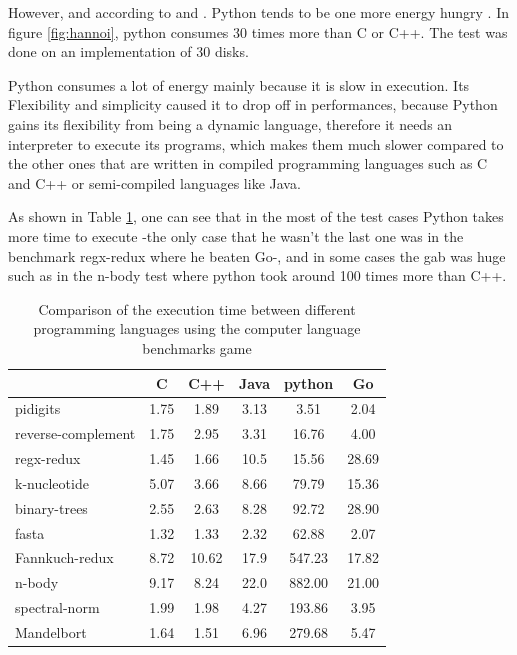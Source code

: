 However, and according to \cite{pinto_energy_2017} and \cite{noureddine_preliminary_2012}. Python tends to be one more energy hungry . In figure \ref{fig:hannoi}, python consumes 30 times more than C or C++. The test was done on an implementation of   30 disks.

Python consumes a lot of energy mainly because it is slow in execution. Its Flexibility and simplicity caused it to drop off in performances, because Python gains its flexibility from being a dynamic language, therefore it needs an interpreter to execute its programs, which makes them much slower compared to the other ones that are written in compiled programming languages such as C and C++ or semi-compiled languages like Java.

As shown in Table \ref{fig:clbg}, one can see that in the most of the test cases Python takes more time to execute -the only case that he wasn't the last one was in the benchmark regx-redux where he beaten Go-, and in some cases the gab was huge such as in the n-body test where python took around 100 times more than C++.

\begin{table}[hbt]
    \begin{tabular}{l|*{5}c}
                           & C    & C++   & Java & python & Go    \\
        \hline
        pidigits           & 1.75 & 1.89  & 3.13 & 3.51   & 2.04  \\
        reverse-complement & 1.75 & 2.95  & 3.31 & 16.76  & 4.00  \\
        regx-redux         & 1.45 & 1.66  & 10.5 & 15.56  & 28.69 \\
        k-nucleotide       & 5.07 & 3.66  & 8.66 & 79.79  & 15.36 \\
        binary-trees       & 2.55 & 2.63  & 8.28 & 92.72  & 28.90 \\
        fasta              & 1.32 & 1.33  & 2.32 & 62.88  & 2.07  \\
        Fannkuch-redux     & 8.72 & 10.62 & 17.9 & 547.23 & 17.82 \\
        n-body             & 9.17 & 8.24  & 22.0 & 882.00 & 21.00 \\
        spectral-norm      & 1.99 & 1.98  & 4.27 & 193.86 & 3.95  \\
        Mandelbort         & 1.64 & 1.51  & 6.96 & 279.68 & 5.47
    \end{tabular}
    \caption{Comparison of the execution time between different programming languages using the computer language benchmarks game \cite{noauthor_which_nodate}}
    \label{fig:clbg}
\end{table}


